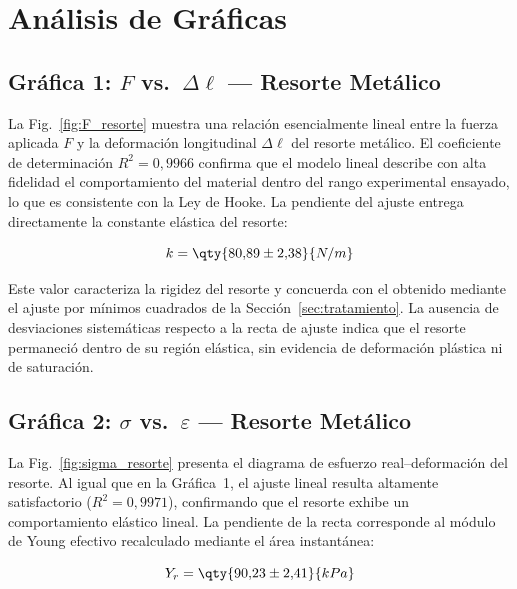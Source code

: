 
\section{Análisis de Gráficas}
\label{sec:analisis_graficas}

\subsection{Gráfica 1: \texorpdfstring{$F$ vs.\ $\Delta\ell$}{F vs. Delta l} — Resorte Metálico}

La Fig.~\ref{fig:F_resorte} muestra una relación esencialmente lineal entre
la fuerza aplicada $F$ y la deformación longitudinal $\Delta\ell$ del
resorte metálico. El coeficiente de determinación $R^2 = 0{,}9966$ confirma
que el modelo lineal describe con alta fidelidad el comportamiento del
material dentro del rango experimental ensayado, lo que es consistente con la
Ley de Hooke. La pendiente del ajuste entrega directamente la constante
elástica del resorte:

\begin{equation*}
    k = \qty{80{,}89 \pm 2{,}38}{N/m}
\end{equation*}

Este valor caracteriza la rigidez del resorte y concuerda con el obtenido
mediante el ajuste por mínimos cuadrados de la
Sección~\ref{sec:tratamiento}. La ausencia de desviaciones sistemáticas
respecto a la recta de ajuste indica que el resorte permaneció dentro de
su región elástica, sin evidencia de deformación plástica ni de saturación.

\subsection{Gráfica 2: \texorpdfstring{$\sigma$ vs.\ $\varepsilon$}{sigma vs. epsilon} — Resorte Metálico}

La Fig.~\ref{fig:sigma_resorte} presenta el diagrama de esfuerzo real--deformación
del resorte. Al igual que en la Gráfica~1, el ajuste lineal resulta
altamente satisfactorio ($R^2 = 0{,}9971$), confirmando que el resorte
exhibe un comportamiento elástico lineal. La pendiente de la recta corresponde 
al módulo de Young efectivo recalculado mediante el área instantánea:

\begin{equation*}
    Y_r = \qty{90{,}23 \pm 2{,}41}{kPa}
\end{equation*}

